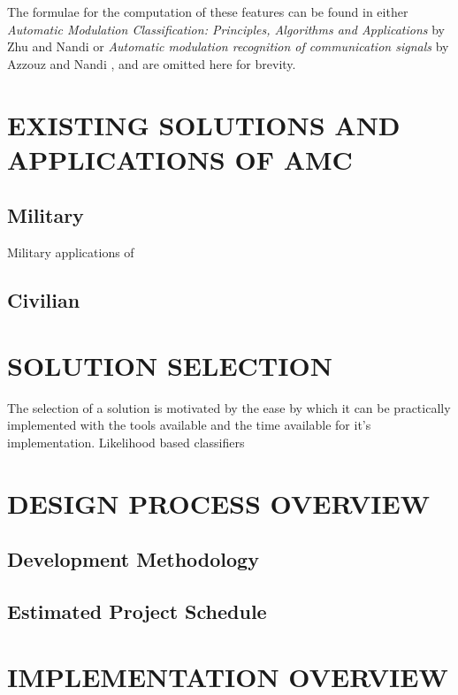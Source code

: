\documentclass[10pt,twocolumn]{witseiepaper}
\begin{document}
	The formulae for the computation of these features can be found in either \textit{Automatic Modulation Classification: Principles, Algorithms and Applications} by Zhu and Nandi \cite{zhu2014automatic} or \textit{Automatic modulation recognition of communication signals} by Azzouz and Nandi \cite{azzouz2013automatic}, and are omitted here for brevity.
	
\section{EXISTING SOLUTIONS AND APPLICATIONS OF AMC}
	\subsection{Military}
		Military applications of 
	\subsection{Civilian}

\section{SOLUTION SELECTION}
	The selection of a solution is motivated by the ease by which it can be practically implemented with the tools available and the time available for it's implementation. Likelihood based classifiers

\section{DESIGN PROCESS OVERVIEW}
	\subsection{Development Methodology}
	\subsection{Estimated Project Schedule}


\section{IMPLEMENTATION OVERVIEW}
\end{document}

